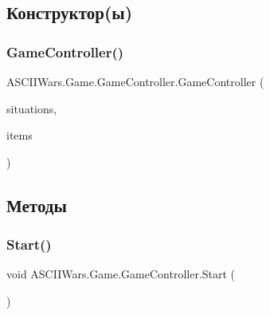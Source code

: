 \subsection{Конструктор(ы)}
\hypertarget{class_a_s_c_i_i_wars_1_1_game_1_1_game_controller_a9a4ad508f104af513b81824b784b0bb0}{}\label{class_a_s_c_i_i_wars_1_1_game_1_1_game_controller_a9a4ad508f104af513b81824b784b0bb0} 
\subsubsection{\texorpdfstring{Game\+Controller()}{GameController()}}
{\footnotesize\ttfamily A\+S\+C\+I\+I\+Wars.\+Game.\+Game\+Controller.\+Game\+Controller (\begin{DoxyParamCaption}\item[{\hyperlink{class_a_s_c_i_i_wars_1_1_game_1_1_situation_container}{Situation\+Container}}]{situations,  }\item[{\hyperlink{class_a_s_c_i_i_wars_1_1_game_1_1_item_container}{Item\+Container}}]{items }\end{DoxyParamCaption})\hspace{0.3cm}{\ttfamily [inline]}}



\subsection{Методы}
\hypertarget{class_a_s_c_i_i_wars_1_1_game_1_1_game_controller_a6a70e650d0140338ebd053c56cd55496}{}\label{class_a_s_c_i_i_wars_1_1_game_1_1_game_controller_a6a70e650d0140338ebd053c56cd55496} 
\subsubsection{\texorpdfstring{Start()}{Start()}}
{\footnotesize\ttfamily void A\+S\+C\+I\+I\+Wars.\+Game.\+Game\+Controller.\+Start (\begin{DoxyParamCaption}{ }\end{DoxyParamCaption})\hspace{0.3cm}{\ttfamily [inline]}}




